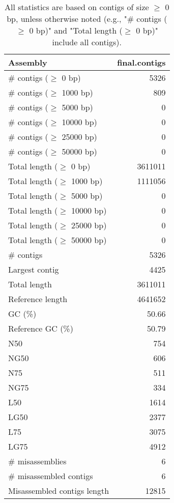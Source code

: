 \documentclass[12pt,a4paper]{article}
\begin{document}
\begin{table}[ht]
\begin{center}
\caption{All statistics are based on contigs of size $\geq$ 0 bp, unless otherwise noted (e.g., "\# contigs ($\geq$ 0 bp)" and "Total length ($\geq$ 0 bp)" include all contigs).}
\begin{tabular}{|l*{1}{|r}|}
\hline
Assembly & final.contigs \\ \hline
\# contigs ($\geq$ 0 bp) & 5326 \\ \hline
\# contigs ($\geq$ 1000 bp) & 809 \\ \hline
\# contigs ($\geq$ 5000 bp) & 0 \\ \hline
\# contigs ($\geq$ 10000 bp) & 0 \\ \hline
\# contigs ($\geq$ 25000 bp) & 0 \\ \hline
\# contigs ($\geq$ 50000 bp) & 0 \\ \hline
Total length ($\geq$ 0 bp) & 3611011 \\ \hline
Total length ($\geq$ 1000 bp) & 1111056 \\ \hline
Total length ($\geq$ 5000 bp) & 0 \\ \hline
Total length ($\geq$ 10000 bp) & 0 \\ \hline
Total length ($\geq$ 25000 bp) & 0 \\ \hline
Total length ($\geq$ 50000 bp) & 0 \\ \hline
\# contigs & 5326 \\ \hline
Largest contig & 4425 \\ \hline
Total length & 3611011 \\ \hline
Reference length & 4641652 \\ \hline
GC (\%) & 50.66 \\ \hline
Reference GC (\%) & 50.79 \\ \hline
N50 & 754 \\ \hline
NG50 & 606 \\ \hline
N75 & 511 \\ \hline
NG75 & 334 \\ \hline
L50 & 1614 \\ \hline
LG50 & 2377 \\ \hline
L75 & 3075 \\ \hline
LG75 & 4912 \\ \hline
\# misassemblies & 6 \\ \hline
\# misassembled contigs & 6 \\ \hline
Misassembled contigs length & 12815 \\ \hline

\end{tabular}
\end{center}
\end{table}
\end{document}
